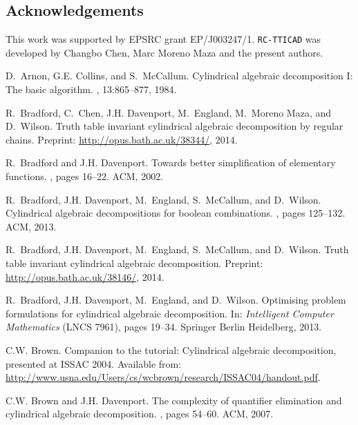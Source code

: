 \documentclass[runningheads,a4paper]{llncs}
\begin{document}
\subsection*{Acknowledgements}
This work was supported by EPSRC grant EP/J003247/1.  \texttt{RC-TTICAD} was developed by Changbo Chen, Marc Moreno Maza and the present authors.

\vspace*{-10pt}



\begin{thebibliography}{99}

D.~Arnon, G.E. Collins, and S.~McCallum.
\newblock Cylindrical algebraic decomposition {I}: The basic algorithm.
, 13:865--877, 1984.

R.~Bradford, C.~Chen, J.H. Davenport, M.~England, M.~Moreno Maza, and
  D.~Wilson.
\newblock Truth table invariant cylindrical algebraic decomposition by regular
  chains.
 Preprint: \url{http://opus.bath.ac.uk/38344/}, 2014.

R.~Bradford and J.H. Davenport.
\newblock Towards better simplification of elementary functions.
, pages 16--22. ACM, 2002.

R.~Bradford, J.H. Davenport, M.~England, S.~McCallum, and D.~Wilson.
\newblock Cylindrical algebraic decompositions for boolean combinations.
, pages 125--132. ACM, 2013.

R.~Bradford, J.H. Davenport, M.~England, S.~McCallum, and D.~Wilson.
\newblock Truth table invariant cylindrical algebraic decomposition.
 Preprint: \url{http://opus.bath.ac.uk/38146/}, 2014.

R.~Bradford, J.H. Davenport, M.~England, and D.~Wilson.
\newblock Optimising problem formulations for cylindrical algebraic
  decomposition.
\newblock In: {\em Intelligent Computer Mathematics} (LNCS 7961), pages 19--34. Springer Berlin Heidelberg, 2013.

C.W. Brown.
\newblock Companion to the tutorial: {C}ylindrical algebraic decomposition,
  presented at {ISSAC} 2004.  Available from:
\newblock
  \url{http://www.usna.edu/Users/cs/wcbrown/research/ISSAC04/handout.pdf}.

C.W. Brown and J.H. Davenport.
\newblock The complexity of quantifier elimination and cylindrical algebraic
  decomposition.
, pages 54--60. ACM, 2007.


\end{thebibliography}
\end{document}
